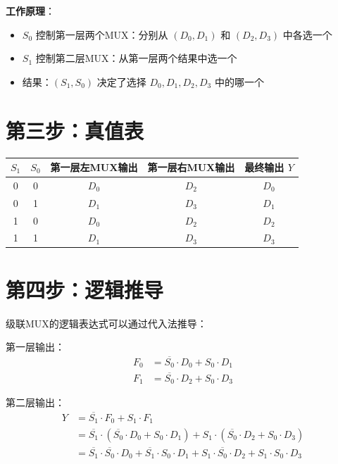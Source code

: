 \textbf{工作原理}：
\begin{itemize}
  \item $S_0$ 控制第一层两个MUX：分别从 $(D_0,D_1)$ 和 $(D_2,D_3)$ 中各选一个
  \item $S_1$ 控制第二层MUX：从第一层两个结果中选一个
  \item 结果：$(S_1,S_0)$ 决定了选择 $D_0, D_1, D_2, D_3$ 中的哪一个
\end{itemize}

\section{第三步：真值表}

\begin{center}
\begin{tabular}{|c|c||c|c|c|}
\hline
$S_1$ & $S_0$ & 第一层左MUX输出 & 第一层右MUX输出 & 最终输出 $Y$ \\
\hline
0 & 0 & $D_0$ & $D_2$ & $D_0$ \\
0 & 1 & $D_1$ & $D_3$ & $D_1$ \\
1 & 0 & $D_0$ & $D_2$ & $D_2$ \\
1 & 1 & $D_1$ & $D_3$ & $D_3$ \\
\hline
\end{tabular}
\end{center}

\section{第四步：逻辑推导}

级联MUX的逻辑表达式可以通过代入法推导：

第一层输出：
\begin{align}
  F_0 &= \overline{S_0} \cdot D_0 + S_0 \cdot D_1 \\
  F_1 &= \overline{S_0} \cdot D_2 + S_0 \cdot D_3
\end{align}

第二层输出：
\begin{align}
  Y &= \overline{S_1} \cdot F_0 + S_1 \cdot F_1 \\
    &= \overline{S_1} \cdot (\overline{S_0} \cdot D_0 + S_0 \cdot D_1)
     + S_1 \cdot (\overline{S_0} \cdot D_2 + S_0 \cdot D_3) \\
    &= \overline{S_1}\cdot\overline{S_0}\cdot D_0
     + \overline{S_1}\cdot S_0 \cdot D_1
     + S_1\cdot\overline{S_0} \cdot D_2
     + S_1\cdot S_0 \cdot D_3
\end{align}

